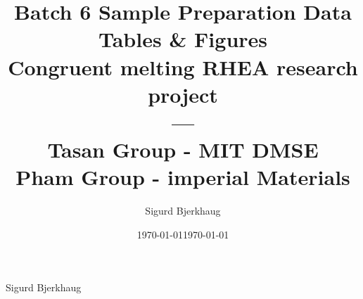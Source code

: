 \documentclass[a4]{article}
\title{Batch 6 Sample Preparation Data Tables \& Figures \\ Congruent melting RHEA research project \\ ---\\Tasan Group - MIT DMSE \\ Pham Group - imperial Materials \\}
\author{Sigurd Bjerkhaug}
\date{\today}
\begin{document}
Sigurd Bjerkhaug
\date{\today}

\begin{table}[h]
    \centering
    
    \caption{}
    \label{tab:my_label}
\end{table}
\end{document}
